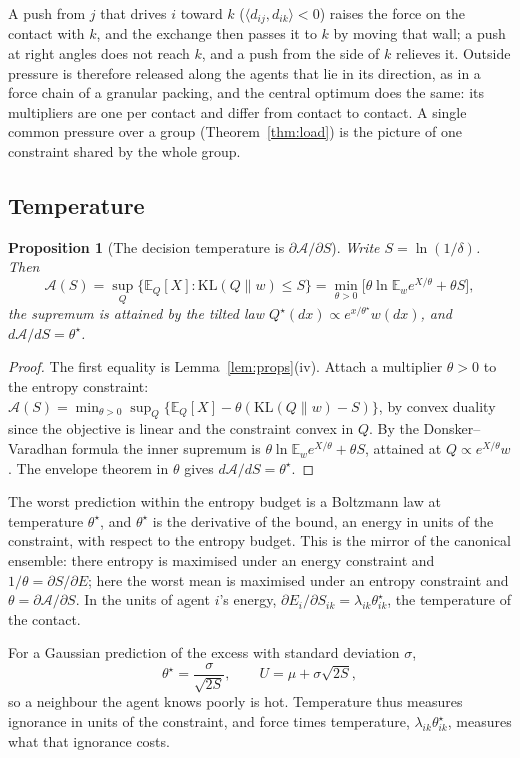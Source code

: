 \documentclass[11pt]{article}
\newtheorem{proposition}[theorem]{Proposition}
\theoremstyle{definition}
\theoremstyle{remark}
\newcommand{\A}{\mathcal{A}}
\newcommand{\E}{\mathbb{E}}
\begin{document}
A push from $j$ that drives $i$ toward $k$ ($\langle d_{ij},d_{ik}\rangle<0$) raises the force on the contact with $k$, and the exchange then passes it to $k$ by moving that wall; a push at right angles does not reach $k$, and a push from the side of $k$ relieves it. Outside pressure is therefore released along the agents that lie in its direction, as in a force chain of a granular packing, and the central optimum does the same: its multipliers are one per contact and differ from contact to contact. A single common pressure over a group (Theorem~\ref{thm:load}) is the picture of one constraint shared by the whole group.

\subsection{Temperature}\label{sec:temp}
\begin{proposition}[The decision temperature is $\partial\A/\partial S$]\label{prop:theta}
Write $S=\ln(1/\delta)$. Then
\[
\A(S)=\sup_Q\{\E_Q[X]:\mathrm{KL}(Q\|w)\le S\}=\min_{\theta>0}\Big[\theta\ln\E_we^{X/\theta}+\theta S\Big],
\]
the supremum is attained by the tilted law $Q^\star(dx)\propto e^{x/\theta^\star}w(dx)$, and $d\A/dS=\theta^\star$.
\end{proposition}
\begin{proof}
The first equality is Lemma~\ref{lem:props}(iv). Attach a multiplier $\theta>0$ to the entropy constraint: $\A(S)=\min_{\theta>0}\sup_Q\{\E_Q[X]-\theta(\mathrm{KL}(Q\|w)-S)\}$, by convex duality since the objective is linear and the constraint convex in $Q$. By the Donsker--Varadhan formula the inner supremum is $\theta\ln\E_we^{X/\theta}+\theta S$, attained at $Q\propto e^{X/\theta}w$. The envelope theorem in $\theta$ gives $d\A/dS=\theta^\star$.
\end{proof}

The worst prediction within the entropy budget is a Boltzmann law at temperature $\theta^\star$, and $\theta^\star$ is the derivative of the bound, an energy in units of the constraint, with respect to the entropy budget. This is the mirror of the canonical ensemble: there entropy is maximised under an energy constraint and $1/\theta=\partial S/\partial E$; here the worst mean is maximised under an entropy constraint and $\theta=\partial\A/\partial S$. In the units of agent $i$'s energy, $\partial E_i/\partial S_{ik}=\lambda_{ik}\theta^\star_{ik}$, the temperature of the contact.

For a Gaussian prediction of the excess with standard deviation $\sigma$,
\[
\theta^\star=\frac{\sigma}{\sqrt{2S}},\qquad U=\mu+\sigma\sqrt{2S},
\]
so a neighbour the agent knows poorly is hot. Temperature thus measures ignorance in units of the constraint, and force times temperature, $\lambda_{ik}\theta^\star_{ik}$, measures what that ignorance costs.
\end{document}
